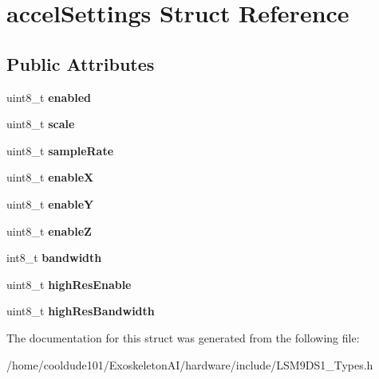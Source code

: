 \hypertarget{structaccelSettings}{}\section{accel\+Settings Struct Reference}
\label{structaccelSettings}
\subsection*{Public Attributes}
\begin{DoxyCompactItemize}
\item 
uint8\+\_\+t {\bfseries enabled}\hypertarget{structaccelSettings_a6ecaf7abfbaf7e74c6986fd93798ad4b}{}\label{structaccelSettings_a6ecaf7abfbaf7e74c6986fd93798ad4b}

\item 
uint8\+\_\+t {\bfseries scale}\hypertarget{structaccelSettings_a3a0a38e5e32ad21fcf8e880f37c0de1e}{}\label{structaccelSettings_a3a0a38e5e32ad21fcf8e880f37c0de1e}

\item 
uint8\+\_\+t {\bfseries sample\+Rate}\hypertarget{structaccelSettings_a51704cb40f1e72ec298f601fedcc6092}{}\label{structaccelSettings_a51704cb40f1e72ec298f601fedcc6092}

\item 
uint8\+\_\+t {\bfseries enableX}\hypertarget{structaccelSettings_a8cd5546cda8657ad2405d378fc815b9a}{}\label{structaccelSettings_a8cd5546cda8657ad2405d378fc815b9a}

\item 
uint8\+\_\+t {\bfseries enableY}\hypertarget{structaccelSettings_a3f9ff5abfde83c5a59808faeb5ad4c6c}{}\label{structaccelSettings_a3f9ff5abfde83c5a59808faeb5ad4c6c}

\item 
uint8\+\_\+t {\bfseries enableZ}\hypertarget{structaccelSettings_abdb5ee5fb9a802315d8340ea5d83b587}{}\label{structaccelSettings_abdb5ee5fb9a802315d8340ea5d83b587}

\item 
int8\+\_\+t {\bfseries bandwidth}\hypertarget{structaccelSettings_ab64c80f62ecfeb3041744febaed9407b}{}\label{structaccelSettings_ab64c80f62ecfeb3041744febaed9407b}

\item 
uint8\+\_\+t {\bfseries high\+Res\+Enable}\hypertarget{structaccelSettings_ad165444ae7996ff6160be01d77d33b62}{}\label{structaccelSettings_ad165444ae7996ff6160be01d77d33b62}

\item 
uint8\+\_\+t {\bfseries high\+Res\+Bandwidth}\hypertarget{structaccelSettings_a3925a8342b5a4b3caecd187e729954f3}{}\label{structaccelSettings_a3925a8342b5a4b3caecd187e729954f3}

\end{DoxyCompactItemize}


The documentation for this struct was generated from the following file\+:\begin{DoxyCompactItemize}
\item 
/home/cooldude101/\+Exoskeleton\+A\+I/hardware/include/L\+S\+M9\+D\+S1\+\_\+\+Types.\+h\end{DoxyCompactItemize}
